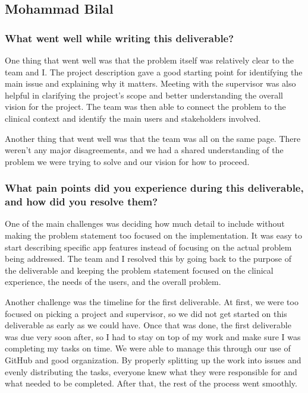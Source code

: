\documentclass{article}
\begin{document}
\subsection*{Mohammad Bilal}

\subsubsection*{What went well while writing this deliverable?}

One thing that went well was that the problem itself was relatively clear to the team and I.
The project description gave a good starting point for identifying the main issue and
explaining why it matters. Meeting with the supervisor was also helpful in clarifying the project's
scope and better understanding the overall vision for the project. The team was then able to connect 
the problem to the clinical context and identify the main users and stakeholders involved.

Another thing that went well was that the team was all on the same page. There weren't any
major disagreements, and we had a shared understanding of the problem we were trying to
solve and our vision for how to proceed.

\subsubsection*{What pain points did you experience during this deliverable, and how did you resolve them?}

One of the main challenges was deciding how much detail to include without making the problem statement
too focused on the implementation. It was easy to start describing specific app features instead of
focusing on the actual problem being addressed. The team and I resolved this by going back to the
purpose of the deliverable and keeping the problem statement focused on the clinical experience,
the needs of the users, and the overall problem.

Another challenge was the timeline for the first deliverable. At first, we were too focused on picking
a project and supervisor, so we did not get started on this deliverable as early as we could have.
Once that was done, the first deliverable was due very soon after, so I had to stay on top of my work
and make sure I was completing my tasks on time. We were able to manage this through our use of GitHub
and good organization. By properly splitting up the work into issues and evenly distributing the tasks,
everyone knew what they were responsible for and what needed to be completed. After that, the rest
of the process went smoothly.
\end{document}
